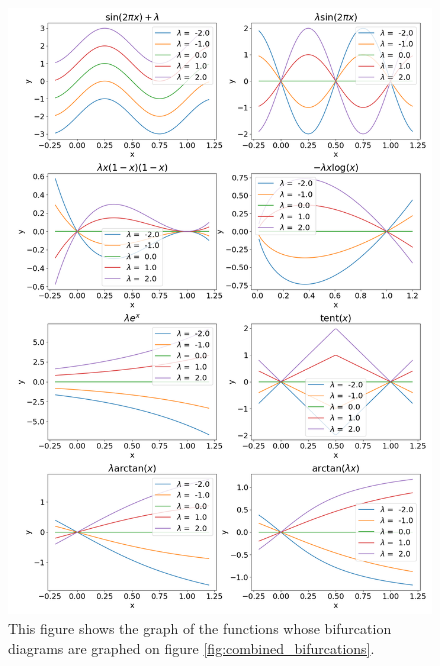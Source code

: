 \begin{figure}
	\centering
	\includegraphics[width=\textwidth]{./figures/combined_functions.png}
	\caption{
		This figure shows the graph of the functions whose bifurcation diagrams are graphed on figure \ref{fig:combined_bifurcations}.
	}
	\label{fig:combined_bifurcations_functions_graph}
\end{figure}
